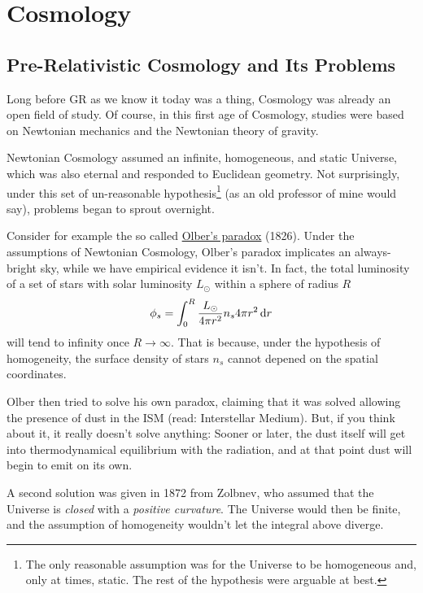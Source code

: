 \chapter{Cosmology}\label{ch:iv}

\section*{Pre-Relativistic Cosmology and Its Problems}

Long before GR as we know it today was a thing, Cosmology was already an open field of study. Of course, in this first age of Cosmology, studies were based on Newtonian mechanics and the Newtonian theory of gravity.
\par Newtonian Cosmology assumed an infinite, homogeneous, and static Universe, which was also eternal and responded to Euclidean geometry. Not surprisingly, under this set of un-reasonable hypothesis\footnote{The only reasonable assumption was for the Universe to be homogeneous and, only at times, static. The rest of the hypothesis were arguable at best.} (as an old professor of mine would say), problems began to sprout overnight.
\par Consider for example the so called \href{https://en.wikipedia.org/wiki/Olbers%27_paradox}{Olber's paradox} (1826). Under the assumptions of Newtonian Cosmology, Olber's paradox implicates an always-bright sky, while we have empirical evidence it isn't. In fact, the total luminosity of a set of stars with solar luminosity $L_{\odot}$ within a sphere of radius $R$
\begin{equation*}
    \phi_{s} = \int_{0}^{R} \frac{L_{\odot}}{4\pi r^{2}}n_{s}4\pi r^{2}\,\text{d}r
\end{equation*}
will tend to infinity once $R\to \infty$. That is because, under the hypothesis of homogeneity, the surface density of stars $n_{s}$ cannot depened on the spatial coordinates.
\par Olber then tried to solve his own paradox, claiming that it was solved allowing the presence of dust in the ISM (read: Interstellar Medium). But, if you think about it, it really doesn't solve anything: Sooner or later, the dust itself will get into thermodynamical equilibrium with the radiation, and at that point dust will begin to emit on its own.
\par A second solution was given in 1872 from Zolbnev, who assumed that the Universe is \emph{closed} with a \emph{positive curvature}. The Universe would then be finite, and the assumption of homogeneity wouldn't let the integral above diverge.
